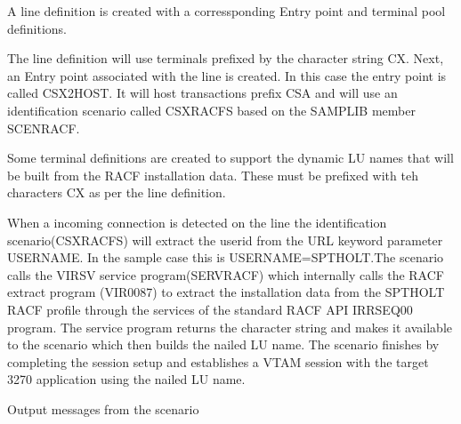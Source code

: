 \documentclass[letterpaper,10pt,english]{sphinxmanual}
\begin{document}
\sphinxAtStartPar
A line definition is created with a corressponding Entry point and terminal pool definitions.

\sphinxAtStartPar
{}

\sphinxAtStartPar
The line definition will use terminals prefixed by the character string CX. Next, an Entry point associated with the line is created. In this case the entry point is called CSX2HOST. It will host transactions prefix CSA and will use an identification scenario called CSXRACFS based on the SAMPLIB member SCENRACF.

\sphinxAtStartPar
{}

\sphinxAtStartPar
Some terminal definitions are created to support the dynamic LU names that will be built from the RACF installation data. These must be prefixed with teh characters CX as per the line definition.

\sphinxAtStartPar
{}

\sphinxAtStartPar
When a incoming connection is detected on the line the identification scenario(CSXRACFS) will extract the userid from the URL keyword parameter USERNAME. In the sample case this is USERNAME=SPTHOLT.The scenario calls the VIRSV service program(SERVRACF) which internally calls the RACF extract program (VIR0087) to extract the installation data from the SPTHOLT RACF profile through the services of the standard RACF API IRRSEQ00 program. The service program returns the character string and makes it available to the scenario which then builds the nailed LU name. The scenario finishes by completing the session setup and establishes a VTAM session with the target 3270 application using the nailed LU name.

\sphinxAtStartPar
Output messages from the scenario
\end{document}
